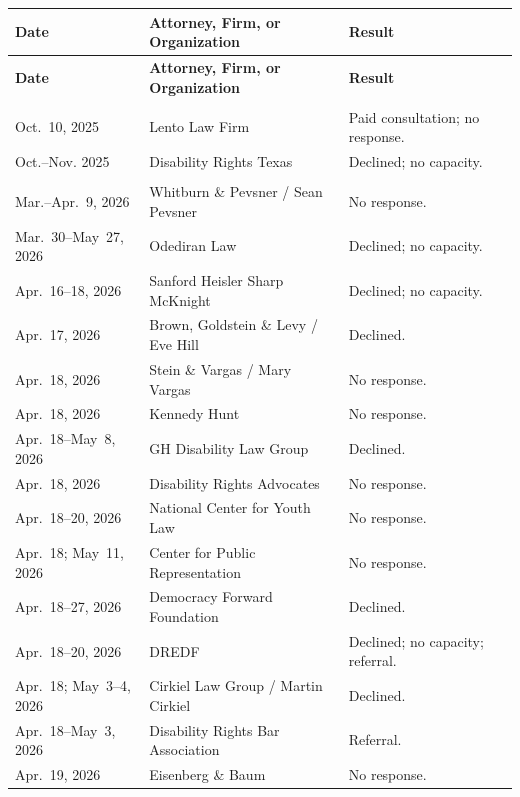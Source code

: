 \documentclass[12pt]{article}
\makeatletter
\renewcommand{\arraystretch}{1.12}
\newcommand{\missinggaprow}{\multicolumn{3}{@{}l@{}}{\makebox[0pt][r]{$\triangleright$\hspace{0.45em}}{\color{black!60}$\cdots$}}\\}
\makeatother
\begin{document}
\vspace{0.4em}
{
\setlength{\LTpre}{0.35em}
\setlength{\LTpost}{0.85em}
\setlength{\LTleft}{0pt}
\setlength{\LTright}{0pt}
\setlength{\tabcolsep}{3pt}
\setlength{\parskip}{0pt}
\renewcommand{\arraystretch}{1.12}
\begin{longtable}{
  @{}
  >{\raggedright\arraybackslash}p{}
  >{\raggedright\arraybackslash}p{}
  >{\raggedright\arraybackslash}p{}
  @{}
}
\textbf{Date} & \textbf{Attorney, Firm, or Organization} & \textbf{Result} \\
\hline
\endfirsthead
\textbf{Date} & \textbf{Attorney, Firm, or Organization} & \textbf{Result} \\
\hline
\endhead
\missinggaprow
Oct.~10, 2025 & Lento Law Firm & Paid consultation; no response. \\
Oct.--Nov. 2025 & Disability Rights Texas & Declined; no capacity. \\
\missinggaprow
Mar.--Apr.~9, 2026 & Whitburn \& Pevsner / Sean Pevsner & No response. \\
Mar.~30--May~27, 2026 & Odediran Law & Declined; no capacity. \\
Apr.~16--18, 2026 & Sanford Heisler Sharp McKnight & Declined; no capacity. \\
Apr.~17, 2026 & Brown, Goldstein \& Levy / Eve Hill & Declined. \\
Apr.~18, 2026 & Stein \& Vargas / Mary Vargas & No response. \\
Apr.~18, 2026 & Kennedy Hunt & No response. \\
Apr.~18--May~8, 2026 & GH Disability Law Group & Declined. \\
Apr.~18, 2026 & Disability Rights Advocates & No response. \\
Apr.~18--20, 2026 & National Center for Youth Law & No response. \\
Apr.~18; May~11, 2026 & Center for Public Representation & No response. \\
Apr.~18--27, 2026 & Democracy Forward Foundation & Declined. \\
Apr.~18--20, 2026 & DREDF & Declined; no capacity; referral. \\
Apr.~18; May~3--4, 2026 & Cirkiel Law Group / Martin Cirkiel & Declined. \\
Apr.~18--May~3, 2026 & Disability Rights Bar Association & Referral. \\
Apr.~19, 2026 & Eisenberg \& Baum & No response. \\

\end{longtable}}
\end{document}
